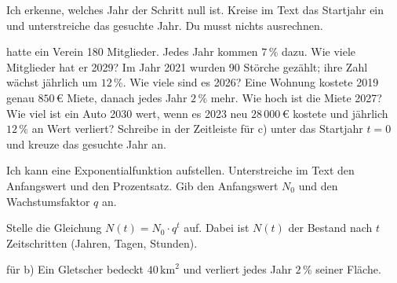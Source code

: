 \setcounter{aufgabe}{27}
\hypertarget{e3}{}

\begin{aufgabe}{Ich erkenne, welches Jahr der Schritt null ist. Kreise im Text das Startjahr ein und unterstreiche das gesuchte Jahr. Du musst nichts ausrechnen.}
\begin{teile}
 hatte ein Verein 180 Mitglieder. Jedes Jahr kommen $7\,\%$ dazu. Wie viele Mitglieder hat er 2029?
\teil Im Jahr 2021 wurden 90 Störche gezählt; ihre Zahl wächst jährlich um $12\,\%$. Wie viele sind es 2026?
\teil Eine Wohnung kostete 2019 genau $850\,€$ Miete, danach jedes Jahr $2\,\%$ mehr. Wie hoch ist die Miete 2027?
\teil Wie viel ist ein Auto 2030 wert, wenn es 2023 neu $28\,000\,€$ kostete und jährlich $12\,\%$ an Wert verliert?
\teil Schreibe in der Zeitleiste für c) unter das Startjahr $t = 0$ und kreuze das gesuchte Jahr an.
\end{teile}


\end{aufgabe}

\begin{aufgabe}{Ich kann eine Exponentialfunktion aufstellen. Unterstreiche im Text den Anfangswert und den Prozentsatz. Gib den Anfangswert $N_0$ und den Wachstumsfaktor $q$ an.}
\begin{geruest}
\end{geruest}
Stelle die Gleichung $N(t) = N_0 \cdot q^t$ auf. Dabei ist $N(t)$ der Bestand nach $t$ Zeitschritten (Jahren, Tagen, Stunden).
\begin{teile}
\teil für b) \quad {}
\teil Ein Gletscher bedeckt $40\,\text{km}^2$ und verliert jedes Jahr $2\,\%$ seiner Fläche. \quad {}
\end{teile}
\end{aufgabe}

